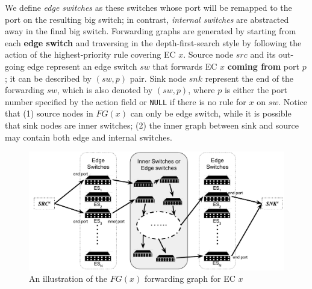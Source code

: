 We define \textit{edge switches} as these switches whose port will be remapped to the port on
the resulting big switch;
in contrast, \textit{internal switches} are abstracted away in the final big switch.
Forwarding graphs are generated by starting from each \textbf{edge switch} and traversing
in the depth-first-search style by following the action of the highest-priority rule
covering EC $x$.
Source node $src$ and its out-going edge represent an edge switch $sw$ that
forwards EC $x$ \textbf{coming from} port $p$; it can be described by $(sw, p)$ pair.
Sink node $snk$ represent the end of the forwarding $sw$,
which is also denoted by $(sw, p)$, where $p$ is either the port number
specified by the action field or \texttt{NULL} if there is no rule for $x$ on $sw$.
Notice that (1) source nodes in $FG(x)$ can only be edge switch,
while it is possible that sink nodes are inner switches;
(2) the inner graph between sink and source may contain both edge and internal switches.

\begin{figure}[t]
\centering
\includegraphics[scale=.75]{figures/ForwardingGraph.pdf}
\caption{An illustration of the $FG(x)$ forwarding graph for EC $x$}
\label{Fig:ForwardingGraphECX}
\end{figure}

